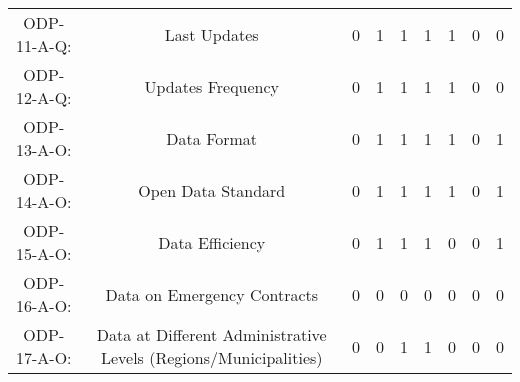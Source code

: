 \documentclass[a4paper, twoside]{report}
\begin{document}
\begin{table}[htbp]
\begin{adjustbox}{max width=\linewidth}
\begin{tabular}{rcccccccc}
    \midrule
    \multicolumn{1}{c}{ODP-11-A-Q:} & \multicolumn{1}{p{19em}}{\cellcolor[rgb]{ .749,  .749,  .749}Last Updates} & \cellcolor[rgb]{ .749,  .749,  .749}0 & \cellcolor[rgb]{ .749,  .749,  .749}1 & \cellcolor[rgb]{ .749,  .749,  .749}1 & \cellcolor[rgb]{ .749,  .749,  .749}1 & \cellcolor[rgb]{ .749,  .749,  .749}1 & \cellcolor[rgb]{ .749,  .749,  .749}0 & \cellcolor[rgb]{ .749,  .749,  .749}0 \\
    \multicolumn{1}{c}{ODP-12-A-Q:} & \multicolumn{1}{p{19em}}{\cellcolor[rgb]{ .749,  .749,  .749}Updates Frequency} & \cellcolor[rgb]{ .749,  .749,  .749}0 & \cellcolor[rgb]{ .749,  .749,  .749}1 & \cellcolor[rgb]{ .749,  .749,  .749}1 & \cellcolor[rgb]{ .749,  .749,  .749}1 & \cellcolor[rgb]{ .749,  .749,  .749}1 & \cellcolor[rgb]{ .749,  .749,  .749}0 & \cellcolor[rgb]{ .749,  .749,  .749}0 \\
    \multicolumn{1}{c}{ODP-13-A-O:} & \multicolumn{1}{p{19em}}{Data Format} & 0     & 1     & 1     & 1     & 1     & 0     & 1 \\
    \multicolumn{1}{c}{ODP-14-A-O:} & \multicolumn{1}{p{19em}}{\cellcolor[rgb]{ .749,  .749,  .749}Open Data Standard} & \cellcolor[rgb]{ .749,  .749,  .749}0 & \cellcolor[rgb]{ .749,  .749,  .749}1 & \cellcolor[rgb]{ .749,  .749,  .749}1 & \cellcolor[rgb]{ .749,  .749,  .749}1 & \cellcolor[rgb]{ .749,  .749,  .749}1 & \cellcolor[rgb]{ .749,  .749,  .749}0 & \cellcolor[rgb]{ .749,  .749,  .749}1 \\
    \multicolumn{1}{c}{ODP-15-A-O:} & \multicolumn{1}{p{19em}}{Data Efficiency} & 0     & 1     & 1     & 1     & 0     & 0     & 1 \\
    \multicolumn{1}{c}{ODP-16-A-O:} & \multicolumn{1}{p{19em}}{\cellcolor[rgb]{ .749,  .749,  .749}Data on Emergency Contracts} & \cellcolor[rgb]{ .749,  .749,  .749}0 & \cellcolor[rgb]{ .749,  .749,  .749}0 & \cellcolor[rgb]{ .749,  .749,  .749}0 & \cellcolor[rgb]{ .749,  .749,  .749}0 & \cellcolor[rgb]{ .749,  .749,  .749}0 & \cellcolor[rgb]{ .749,  .749,  .749}0 & \cellcolor[rgb]{ .749,  .749,  .749}0 \\
    \multicolumn{1}{c}{ODP-17-A-O:} & \multicolumn{1}{p{19em}}{\cellcolor[rgb]{ .749,  .749,  .749}Data at Different Administrative Levels (Regions/Municipalities)} & \cellcolor[rgb]{ .749,  .749,  .749}0 & \cellcolor[rgb]{ .749,  .749,  .749}0 & \cellcolor[rgb]{ .749,  .749,  .749}1 & \cellcolor[rgb]{ .749,  .749,  .749}1 & \cellcolor[rgb]{ .749,  .749,  .749}0 & \cellcolor[rgb]{ .749,  .749,  .749}0 & \cellcolor[rgb]{ .749,  .749,  .749}0 \\

\end{tabular}
\end{adjustbox}
\end{table}
\end{document}
